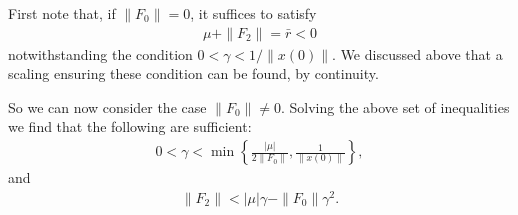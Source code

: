\documentclass[superscriptaddress,onecolumn,nofootinbib,longbibliography,a4paper,accepted=2026-09-29]{quantumarticle}
\theoremstyle{plain}
\theoremstyle{definition}
\numberwithin{thm}{section}
\numberwithin{assumption}{section}
\numberwithin{lemma}{section}
\numberwithin{prop}{section}
\numberwithin{cor}{section}
\numberwithin{definition}{section}
\numberwithin{rmk}{section}
\numberwithin{equation}{section}
\begin{document}
First note that, if $\|F_0\| = 0$, it suffices to satisfy
\begin{align}
   \mu + \| F_2\|  = \bar{r} < 0
\end{align}
notwithstanding the condition $0< \gamma < 1/\| x(0)\|$. We discussed above that a scaling ensuring these condition can be found, by continuity. 

So we can now consider the case $\|F_0\| \neq 0$. Solving the above set of inequalities we find that the following are sufficient:
\begin{align}
\label{eq:gammainequality}
    0 < \gamma < \min \left\{\frac{|\mu| }{2\| F_0\|}, \frac{1}{\| x(0)\|}\right\},
\end{align}
and 
\begin{align}
    \| F_2\| < | \mu| \gamma -  \| F_0\| \gamma^2. 
\end{align}
\end{document}
